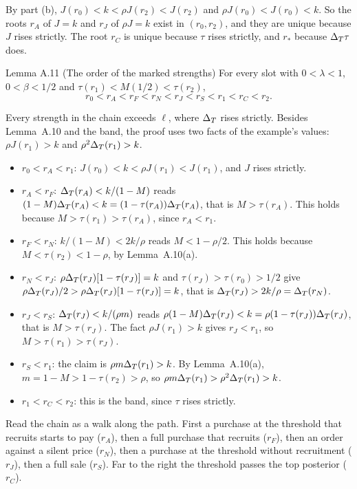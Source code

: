 By part (b), \(J(r_0)<k<\rho J(r_2)<J(r_2)\) and \(\rho J(r_0)<J(r_0)<k\). So the roots \(r_A\) of \(J=k\) and \(r_J\) of
\(\rho J=k\) exist in \((r_0,r_2)\), and they are unique because \(J\) rises strictly. The root \(r_C\) is unique
because \(\tau\) rises strictly, and \(r_*\) because \(\Delta_T\tau\) does.

\begin{paperresult}{Lemma A.11 (The order of the marked strengths)}
For every slot with \(0<\lambda<1\), \(0<\beta<1/2\) and \(\tau(r_1)<M(1/2)<\tau(r_2)\),
\[
r_0<r_A<r_F<r_N<r_J<r_S<r_1<r_C<r_2 .
\]
\end{paperresult}

\begin{derivation}
Every strength in the chain exceeds \(\ell\), where \(\Delta_T\) rises strictly. Besides Lemma~A.10 and the band, the proof
uses two facts of the example's values: \(\rho J(r_1)>k\) and \(\rho^2\Delta_T(r_1)>k\).
\begin{itemize}
\item \(r_0<r_A<r_1\): \(J(r_0)<k<\rho J(r_1)<J(r_1)\), and \(J\) rises strictly.
\item \(r_A<r_F\): \(\Delta_T(r_A)<k/(1-M)\) reads \((1-M)\Delta_T(r_A)<k=(1-\tau(r_A))\Delta_T(r_A)\), that is \(M>\tau(r_A)\). This
holds because \(M>\tau(r_1)>\tau(r_A)\), since \(r_A<r_1\).
\item \(r_F<r_N\): \(k/(1-M)<2k/\rho\) reads \(M<1-\rho/2\). This holds because \(M<\tau(r_2)<1-\rho\), by
Lemma~A.10(a).
\item \(r_N<r_J\): \(\rho\Delta_T(r_J)[1-\tau(r_J)]=k\) and \(\tau(r_J)>\tau(r_0)>1/2\) give
\(\rho\Delta_T(r_J)/2>\rho\Delta_T(r_J)[1-\tau(r_J)]=k\), that is \(\Delta_T(r_J)>2k/\rho=\Delta_T(r_N)\).
\item \(r_J<r_S\): \(\Delta_T(r_J)<k/(\rho m)\) reads \(\rho(1-M)\Delta_T(r_J)<k=\rho(1-\tau(r_J))\Delta_T(r_J)\), that is
\(M>\tau(r_J)\). The fact \(\rho J(r_1)>k\) gives \(r_J<r_1\), so \(M>\tau(r_1)>\tau(r_J)\).
\item \(r_S<r_1\): the claim is \(\rho m\Delta_T(r_1)>k\). By Lemma~A.10(a), \(m=1-M>1-\tau(r_2)>\rho\), so
\(\rho m\Delta_T(r_1)>\rho^2\Delta_T(r_1)>k\).
\item \(r_1<r_C<r_2\): this is the band, since \(\tau\) rises strictly.
\end{itemize}
\end{derivation}

Read the chain as a walk along the path. First a purchase at the threshold that recruits starts to pay (\(r_A\)),
then a full purchase that recruits (\(r_F\)), then an order against a silent price (\(r_N\)), then a purchase at the
threshold without recruitment (\(r_J\)), then a full sale (\(r_S\)). Far to the right the threshold passes the top
posterior (\(r_C\)).

